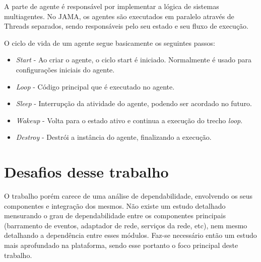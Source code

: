 A parte de agente é responsável por implementar a lógica de sistemas multiagentes. No JAMA, os agentes são executados em paralelo através de Threads separados, sendo responsáveis pelo seu estado e seu fluxo de execução.

O ciclo de vida de um agente segue basicamente os seguintes passos:

\begin{itemize}
	\item \emph{Start} - Ao criar o agente, o ciclo start é iniciado. Normalmente é usado para configurações iniciais do agente.
	\item \emph{Loop} - Código principal que é executado no agente.
	\item \emph{Sleep} - Interrupção da atividade do agente, podendo ser acordado no futuro.
	\item \emph{Wakeup} - Volta para o estado ativo e continua a execução do trecho \emph{loop}.
	\item \emph{Destroy} - Destrói a instância do agente, finalizando a execução.
\end{itemize}


\section{Desafios desse trabalho}
O trabalho porém carece de uma análise de dependabilidade, envolvendo os seus componentes e integração dos mesmos. Não existe um estudo detalhado mensurando o grau de dependabilidade entre os componentes principais (barramento de eventos, adaptador de rede, serviços da rede, etc), nem mesmo detalhando a dependência entre esses módulos. Faz-se necessário então um estudo mais aprofundado na plataforma, sendo esse portanto o foco principal deste trabalho.



























